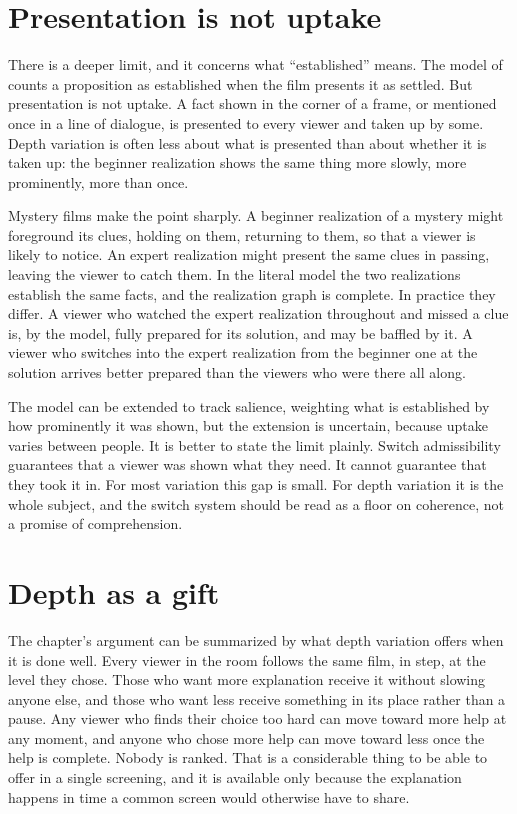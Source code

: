 \section{Presentation is not uptake}

There is a deeper limit, and it concerns what ``established'' means. The model of  counts a proposition as established when the film presents it as settled. But presentation is not uptake. A fact shown in the corner of a frame, or mentioned once in a line of dialogue, is presented to every viewer and taken up by some. Depth variation is often less about what is presented than about whether it is taken up: the beginner realization shows the same thing more slowly, more prominently, more than once.

Mystery films make the point sharply. A beginner realization of a mystery might foreground its clues, holding on them, returning to them, so that a viewer is likely to notice. An expert realization might present the same clues in passing, leaving the viewer to catch them. In the literal model the two realizations establish the same facts, and the realization graph is complete. In practice they differ. A viewer who watched the expert realization throughout and missed a clue is, by the model, fully prepared for its solution, and may be baffled by it. A viewer who switches into the expert realization from the beginner one at the solution arrives better prepared than the viewers who were there all along.

The model can be extended to track salience, weighting what is established by how prominently it was shown, but the extension is uncertain, because uptake varies between people. It is better to state the limit plainly. Switch admissibility guarantees that a viewer was shown what they need. It cannot guarantee that they took it in. For most variation this gap is small. For depth variation it is the whole subject, and the switch system should be read as a floor on coherence, not a promise of comprehension.

\section{Depth as a gift}

The chapter's argument can be summarized by what depth variation offers when it is done well. Every viewer in the room follows the same film, in step, at the level they chose. Those who want more explanation receive it without slowing anyone else, and those who want less receive something in its place rather than a pause. Any viewer who finds their choice too hard can move toward more help at any moment, and anyone who chose more help can move toward less once the help is complete. Nobody is ranked. That is a considerable thing to be able to offer in a single screening, and it is available only because the explanation happens in time a common screen would otherwise have to share.
